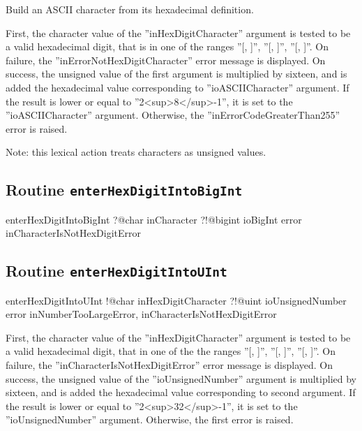 Build an ASCII character from its hexadecimal definition.

First, the character value of the ''inHexDigitCharacter'' argument is tested to be a valid hexadecimal digit, that is in one of the ranges ''[\textquotesingle, \textquotesingle]'', ''[\textquotesingle, \textquotesingle]'', ''[\textquotesingle, \textquotesingle]''. On failure, the ''inErrorNotHexDigitCharacter'' error message is displayed. On success, the unsigned value of the first argument is multiplied by sixteen, and is added the hexadecimal value corresponding to ''ioASCIICharacter'' argument. If the result is lower or equal to ''2<sup>8</sup>-1'', it is set to the ''ioASCIICharacter'' argument. Otherwise, the ''inErrorCodeGreaterThan255'' error is raised.

Note: this lexical action treats characters as unsigned values.




\subsection{Routine \texttt{enterHexDigitIntoBigInt}}

\begin{galgas3}
enterHexDigitIntoBigInt ?@char inCharacter
                        ?!@bigint ioBigInt
                        error inCharacterIsNotHexDigitError
\end{galgas3}








\subsection{Routine \texttt{enterHexDigitIntoUInt}}

\begin{galgas3}
enterHexDigitIntoUInt !@char inHexDigitCharacter
                      ?!@uint ioUnsignedNumber
                      error inNumberTooLargeError,
                            inCharacterIsNotHexDigitError
\end{galgas3}

First, the character value of the ''inHexDigitCharacter'' argument is tested to be a valid hexadecimal digit, that in one of the the ranges ''[\textquotesingle, \textquotesingle]'', ''[\textquotesingle, \textquotesingle]'', ''[\textquotesingle, \textquotesingle]''. On failure, the ''inCharacterIsNotHexDigitError'' error message is displayed. On success, the unsigned value of the ''ioUnsignedNumber'' argument is multiplied by sixteen, and is added the hexadecimal value corresponding to second argument. If the result is lower or equal to ''2<sup>32</sup>-1'', it is set to the ''ioUnsignedNumber'' argument. Otherwise, the first error is raised.

